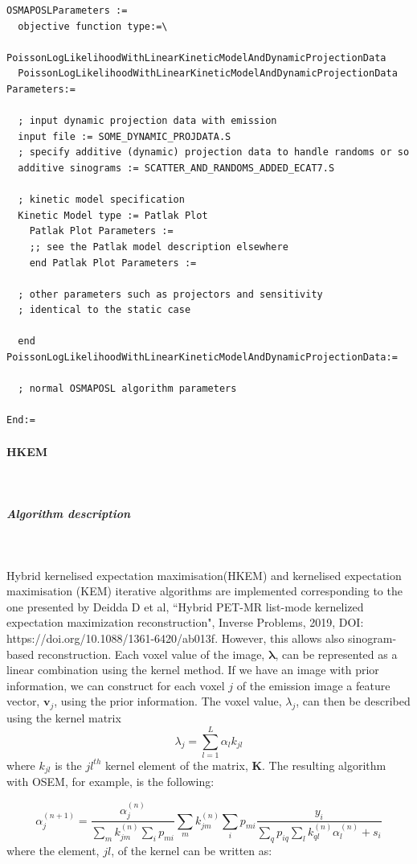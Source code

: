 \documentclass{article}
\newcommand{\subsubsubsection}[1]{\paragraph{#1}\mbox{} \\}
\newcommand{\subsubsubsubsection}[1]{\subparagraph{#1} \mbox{} \\}
\begin{document}
\begin{verbatim}
OSMAPOSLParameters :=
  objective function type:=\
     PoissonLogLikelihoodWithLinearKineticModelAndDynamicProjectionData
  PoissonLogLikelihoodWithLinearKineticModelAndDynamicProjectionData Parameters:=

  ; input dynamic projection data with emission
  input file := SOME_DYNAMIC_PROJDATA.S
  ; specify additive (dynamic) projection data to handle randoms or so
  additive sinograms := SCATTER_AND_RANDOMS_ADDED_ECAT7.S

  ; kinetic model specification
  Kinetic Model type := Patlak Plot
    Patlak Plot Parameters :=
    ;; see the Patlak model description elsewhere
    end Patlak Plot Parameters :=

  ; other parameters such as projectors and sensitivity 
  ; identical to the static case

  end PoissonLogLikelihoodWithLinearKineticModelAndDynamicProjectionData:=

  ; normal OSMAPOSL algorithm parameters 

End:=
\end{verbatim}

{ \subsubsubsection{HKEM}
}
\label{sec:HKEM}
  { \subsubsubsubsection{Algorithm description}
  }
  Hybrid kernelised expectation maximisation(HKEM) and kernelised expectation maximisation (KEM) iterative algorithms
  are implemented corresponding to the one presented by Deidda D et al, ``Hybrid PET-MR list-mode kernelized expectation maximization reconstruction",
  Inverse Problems, 2019, DOI: https://doi.org/10.1088/1361-6420/ab013f. However, this allows
  also sinogram-based reconstruction. Each voxel value of the image, $ \boldsymbol{\lambda}$, can be represented as a
  linear combination using the kernel method.  If we have an image with prior information, we can construct for each voxel
  $ j $ of the emission image a feature vector, $ \boldsymbol{v}_j $, using the prior information. The voxel value,
  $\lambda_j$, can then be described using the kernel matrix 
  \[
   \lambda_j=  \sum_{l=1}^L \alpha_l k_{jl}
  \]
  \noindent
  where $k_{jl}$ is the $jl^{th}$ kernel element of the matrix, $\boldsymbol{K}$.
  The resulting algorithm with OSEM, for example, is the following:

  \[
  \alpha^{(n+1)}_j =  \frac{ \alpha^{(n)}_j }{\sum_{m} k^{(n)}_{jm} \sum_i p_{mi}} \sum_{m}k^{(n)}_{jm}\sum_i p_{mi}\frac{ y_i }{\sum_{q} p_{iq} \sum_l k^{(n)}_{ql}\alpha^{(n)}_l  + s_i}
  \]
  \noindent
  where the  element, $ jl $, of the kernel can be written as:
\end{document}
